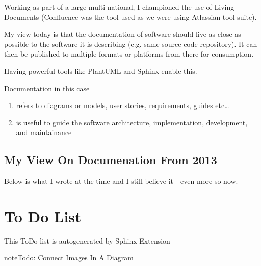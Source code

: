 \documentclass[letterpaper,10pt,english]{sphinxmanual}
\begin{document}
Working as part of a large multi-national, I championed the use of Living Documents (Confluence was the tool used as we were using Atlassian tool suite).

My view today is that the documentation of software should live as close as possible to the software it is describing (e.g. same source code repository).
It can then be published to multiple formats or platforms from there for consumption.

Having powerful tools like PlantUML and Sphinx enable this.

Documentation in this case
\begin{enumerate}
%
\item {} 
refers to diagrams or models, user stories, requirements, guides etc…

\item {} 
is useful to guide the software architecture, implementation, development, and maintainance

\end{enumerate}


\subsection{My View On Documenation From 2013}
\label{\detokenize{DocumentationAsCode/JourneyDocumentationASCode:my-view-on-documenation-from-2013}}
Below is what I wrote at the time and I still believe it - even more so now.

\begin{figure}[htbp]
\centering

\noindent{}
\end{figure}

\begin{figure}[htbp]
\centering

\noindent{}
\end{figure}


\section{To Do List}
\label{\detokenize{todo:to-do-list}}\label{\detokenize{todo::doc}}
This ToDo list is autogenerated by Sphinx  Extension

\begin{sphinxadmonition}{note}{Todo:}
Connect Images In A Diagram
\end{sphinxadmonition}
\end{document}
